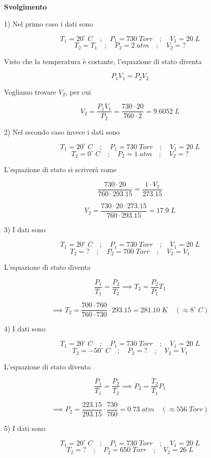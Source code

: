 \vspace{0.2cm}\large\textbf{Svolgimento}\normalsize

\vspace{0.2cm} 1) Nel primo caso i dati sono

$$T_1=20^{\circ}\;C
\quad;\quad
P_1=730\;Torr
\quad;\quad
V_1=20\;L$$
$$T_2=T_1
\quad;\quad
P_2=2\;atm
\quad;\quad
V_2=?$$

Visto che la temperatura è costante, l'equazione di stato diventa

$$P_1V_1=P_2V_2$$

Vogliamo trovare $V_2$, per cui

$$V_2=\frac{P_1V_1}{P_2}
=\frac{730 \cdot 20}{760 \cdot 2}=9.6052\;L$$

2) Nel secondo caso invece i dati sono

$$T_1=20^{\circ}\;C
\quad;\quad
P_1=730\;Torr
\quad;\quad
V_1=20\;L$$
$$T_2=0^{\circ}\;C
\quad;\quad
P_2=1\;atm
\quad;\quad
V_2=?$$

L'equazione di stato si scriverà come

$$\frac{730 \cdot 20}{760 \cdot 293.15}=\frac{1 \cdot V_2}{273.15}$$

$$V_2=\frac{730 \cdot 20 \cdot 273.15}{760 \cdot 293.15}=17.9\;L$$

3) I dati sono

$$T_1=20^{\circ}\;C
\quad;\quad
P_1=730\;Torr
\quad;\quad
V_1=20\;L$$
$$T_2=?
\quad;\quad
P_2=700\;Torr
\quad;\quad
V_2=V_1$$

L'equazione di stato diventa

$$\frac{P_1}{T_1}=\frac{P_2}{T_2}
\implies
T_2=\frac{P_2}{P_1}T_1$$

$$\implies
T_2=\frac{700 \cdot 760}{760 \cdot 730}\cdot 293.15=281.10\;K\quad(\approx 8^{\circ}\;C)$$

4) I dati sono 

$$T_1=20^{\circ}\;C
\quad;\quad
P_1=730\;Torr
\quad;\quad
V_1=20\;L$$
$$T_2=-50^{\circ}\;C
\quad;\quad
P_2=?
\quad;\quad
V_2=V_1$$

L'equazione di stato diventa

$$\frac{P_1}{T_1}=\frac{P_2}{T_2}
\implies
P_2=\frac{T_2}{T_1}P_1$$

$$\implies
P_2=\frac{223.15}{293.15}\cdot \frac{730}{760}=0.73\;atm\quad(\approx 556\;Torr)$$


5) I dati sono

$$T_1=20^{\circ}\;C
\quad;\quad
P_1=730\;Torr
\quad;\quad
V_1=20\;L$$
$$T_2=?
\quad;\quad
P_2=650\;Torr
\quad;\quad
V_2=26\;L$$

